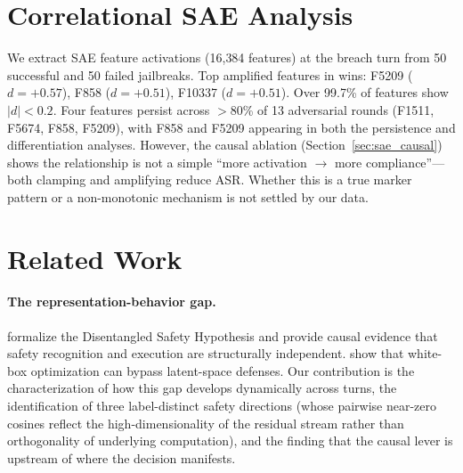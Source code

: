 \documentclass[11pt]{article}
\begin{document}
\section{Correlational SAE Analysis}
\label{sec:sae}

We extract SAE feature activations (16{,}384 features) at the breach turn from 50 successful and 50 failed jailbreaks.
Top amplified features in wins: F5209 ($d=+0.57$), F858 ($d=+0.51$), F10337 ($d=+0.51$).
Over 99.7\% of features show $|d| < 0.2$.
Four features persist across $>$80\% of 13 adversarial rounds (F1511, F5674, F858, F5209), with F858 and F5209 appearing in both the persistence and differentiation analyses.
However, the causal ablation (Section~\ref{sec:sae_causal}) shows the relationship is not a simple ``more activation $\to$ more compliance''---both clamping and amplifying reduce ASR. Whether this is a true marker pattern or a non-monotonic mechanism is not settled by our data.

\section{Related Work}
\label{sec:related}

\paragraph{The representation-behavior gap.}
\citet{wu2026knowingwithoutacting} formalize the Disentangled Safety Hypothesis and provide causal evidence that safety recognition and execution are structurally independent.
\citet{bailey2024obfuscated} show that white-box optimization can bypass latent-space defenses.
Our contribution is the characterization of how this gap develops dynamically across turns, the identification of three label-distinct safety directions (whose pairwise near-zero cosines reflect the high-dimensionality of the residual stream rather than orthogonality of underlying computation), and the finding that the causal lever is upstream of where the decision manifests.
\end{document}
